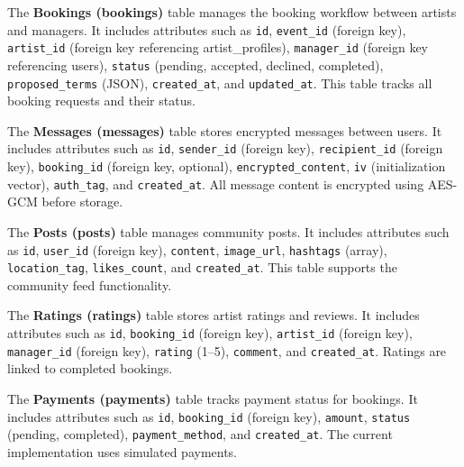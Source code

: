 \documentclass[12pt,a4paper]{report}
\begin{document}
\vspace{0.3cm}

The \textbf{Bookings (bookings)} table manages the booking workflow between artists and managers. It includes attributes such as \texttt{id}, \texttt{event\_id} (foreign key), \texttt{artist\_id} (foreign key referencing artist\_profiles), \texttt{manager\_id} (foreign key referencing users), \texttt{status} (pending, accepted, declined, completed), \texttt{proposed\_terms} (JSON), \texttt{created\_at}, and \texttt{updated\_at}. This table tracks all booking requests and their status.

\vspace{0.3cm}

The \textbf{Messages (messages)} table stores encrypted messages between users. It includes attributes such as \texttt{id}, \texttt{sender\_id} (foreign key), \texttt{recipient\_id} (foreign key), \texttt{booking\_id} (foreign key, optional), \texttt{encrypted\_content}, \texttt{iv} (initialization vector), \texttt{auth\_tag}, and \texttt{created\_at}. All message content is encrypted using AES-GCM before storage.

\vspace{0.3cm}

The \textbf{Posts (posts)} table manages community posts. It includes attributes such as \texttt{id}, \texttt{user\_id} (foreign key), \texttt{content}, \texttt{image\_url}, \texttt{hashtags} (array), \texttt{location\_tag}, \texttt{likes\_count}, and \texttt{created\_at}. This table supports the community feed functionality.

\vspace{0.3cm}

The \textbf{Ratings (ratings)} table stores artist ratings and reviews. It includes attributes such as \texttt{id}, \texttt{booking\_id} (foreign key), \texttt{artist\_id} (foreign key), \texttt{manager\_id} (foreign key), \texttt{rating} (1--5), \texttt{comment}, and \texttt{created\_at}. Ratings are linked to completed bookings.

\vspace{0.3cm}

The \textbf{Payments (payments)} table tracks payment status for bookings. It includes attributes such as \texttt{id}, \texttt{booking\_id} (foreign key), \texttt{amount}, \texttt{status} (pending, completed), \texttt{payment\_method}, and \texttt{created\_at}. The current implementation uses simulated payments.

\vspace{0.3cm}
\end{document}
